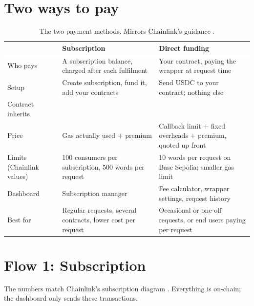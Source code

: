 \documentclass[11pt,a4paper]{article}
\begin{document}
\section{Two ways to pay}
\begin{table}[ht]
\centering\small
\begin{tabularx}{\textwidth}{P{2.8cm}LL}
\toprule
 & \textbf{Subscription} & \textbf{Direct funding}\\
\midrule
Who pays & A subscription balance, charged after each fulfilment & Your contract, paying the wrapper at request time\\
Setup & Create subscription, fund it, add your contracts & Send USDC to your contract; nothing else\\
Contract inherits &  & \\
Price & Gas actually used + premium & Callback limit + fixed overheads + premium, quoted up front\\
Limits (Chainlink values) & 100 consumers per subscription, 500 words per request & 10 words per request on Base Sepolia; smaller gas limit\\
Dashboard & Subscription manager & Fee calculator, wrapper settings, request history\\
Best for & Regular requests, several contracts, lower cost per request & Occasional or one-off requests, or end users paying per request\\
\bottomrule
\end{tabularx}
\caption{The two payment methods. Mirrors Chainlink's guidance \cite{clsub,cldf}.}
\end{table}

\section{Flow 1: Subscription}
The numbers match Chainlink's subscription diagram \cite{clsub}. Everything is on-chain; the dashboard only sends these transactions.
\end{document}
